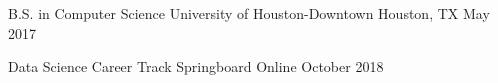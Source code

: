 

\begin{cventries}
	
	\cventryschool
	{B.S. in Computer Science} %
	{University of Houston-Downtown} %
	{Houston, TX} %
	{May 2017} %
	{
		\begin{cvitems} %
			\item {}
		\end{cvitems}
	}
	
	
	\cventryschool
	{Data Science Career Track} %
	{Springboard} %
	{Online} %
	{October 2018} %
	{
		\begin{cvitems} %
			\item {}
		\end{cvitems}
	}
	\vspace*{-6mm}
\end{cventries}
